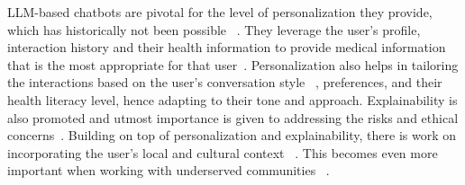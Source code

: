 
LLM-based chatbots are pivotal for the level of personalization they provide, which has historically not been possible ~\cite{kocaballi2019personalization}. They leverage the user's profile, interaction history and their health information to provide medical information that is the most appropriate for that user~\cite{openai2024gpt4technicalreport}. Personalization also helps in tailoring the interactions based on the user's conversation style ~\cite{kocaballi2019personalization}, preferences, and their health literacy level, hence adapting to their tone and approach. Explainability is also promoted and utmost importance is given to addressing the risks and ethical concerns~\cite{ai4030034, shuchaoreview}. Building on top of personalization and explainability, there is work on incorporating the user’s local and cultural context ~\cite{adilazuarda2024measuringmodelingculturellms, 10.1145/1878450.1878481, Ożegalska-Łukasik_Łukasik_2023}. This becomes even more important when working with underserved communities ~\cite{harrington2023trust, kimblack2022, tsengunder}. 

